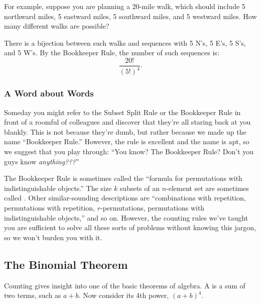 For example, suppose you are planning a 20-mile walk, which should
include 5 northward miles, 5 eastward miles, 5 southward miles, and 5
westward miles.  How many different walks are possible?

There is a bijection between such walks and sequences with 5 N's, 5
E's, 5 S's, and 5 W's.  By the Bookkeeper Rule, the number of such
sequences is:
\[
    \frac{20!}{(5!)^4}.
\]

\begin{problems}
\practiceproblems
{}
\examproblems
{}
\end{problems}

\subsubsection{A Word about Words}

Someday you might refer to the Subset Split Rule or the Bookkeeper Rule
in front of a roomful of colleagues and discover that they're all staring
back at you blankly.  This is not because they're dumb, but rather because
we made up the name ``Bookkeeper Rule.''  However, the rule is excellent
and the name is apt, so we suggest that you play through: ``You know?  The
Bookkeeper Rule?  Don't you guys know \emph{anything???}''

The Bookkeeper Rule is sometimes called the ``formula for permutations
with indistinguishable objects.''  The size $k$ subsets of an $n$-element
set are sometimes called .  Other similar-sounding
descriptions are ``combinations with repetition, permutations with
repetition, $r$-permutations, permutations with indistinguishable
objects,'' and so on.  However, the counting rules we've taught you are
sufficient to solve all these sorts of problems without knowing this
jargon, so we won't burden you with it.

\begin{problems}
\classproblems
{}
\end{problems}


\subsection{The Binomial Theorem}\label{binomial_theorem_sec}

Counting gives insight into one of the basic theorems of algebra.  A
 is a sum of two terms, such as $a + b$.  Now consider its
4th power, $(a + b)^4$.

